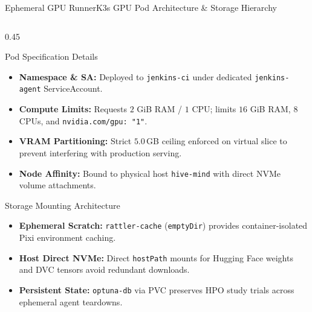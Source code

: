 \begin{frame}[fragile]{Ephemeral GPU Runner}{K3s GPU Pod Architecture \& Storage Hierarchy}
    \begin{columns}[T]
        \begin{column}{0.45\textwidth}
            \begin{block}{Pod Specification Details}
                \begin{itemize}\tiny
                    \item \textbf{Namespace \& SA:} Deployed to \texttt{jenkins-ci} under dedicated \texttt{jenkins-agent} ServiceAccount.
                    \item \textbf{Compute Limits:} Requests $2$ GiB RAM / $1$ CPU; limits $16$ GiB RAM, $8$ CPUs, and \texttt{nvidia.com/gpu: "1"}.
                    \item \textbf{VRAM Partitioning:} Strict $5.0$\,GB ceiling enforced on virtual slice to prevent interfering with production serving.
                    \item \textbf{Node Affinity:} Bound to physical host \texttt{hive-mind} with direct NVMe volume attachments.
                \end{itemize}
            \end{block}

            \vspace{-0.1cm}

            \begin{block}{Storage Mounting Architecture}
                \begin{itemize}\tiny
                    \item \textbf{Ephemeral Scratch:} \texttt{rattler-cache} (\texttt{emptyDir}) provides container-isolated Pixi environment caching.
                    \item \textbf{Host Direct NVMe:} Direct \texttt{hostPath} mounts for Hugging Face weights and DVC tensors avoid redundant downloads.
                    \item \textbf{Persistent State:} \texttt{optuna-db} via PVC preserves HPO study trials across ephemeral agent teardowns.
                \end{itemize}
            \end{block}
        \end{column}


\end{columns}
\end{frame}
